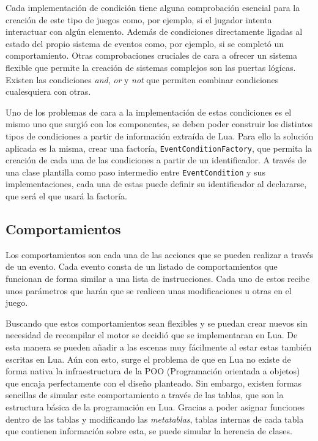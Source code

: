 \medskip

Cada implementación de condición tiene alguna comprobación esencial para la creación de este tipo de juegos como, por ejemplo, si el jugador intenta interactuar con algún elemento. Además de condiciones directamente ligadas al estado del propio sistema de eventos como, por ejemplo, si se completó un comportamiento. Otras comprobaciones cruciales de cara a ofrecer un sistema flexible que permite la creación de sistemas complejos son las puertas lógicas. Existen las condiciones \textit{and}, \textit{or} y \textit{not} que permiten combinar condiciones cualesquiera con otras. 

\medskip

Uno de los problemas de cara a la implementación de estas condiciones es el mismo uno que surgió con los componentes, se deben poder construir los distintos tipos de condiciones a partir de información extraída de Lua. Para ello la solución aplicada es la misma, crear una factoría, \texttt{EventConditionFactory}, que permita la creación de cada una de las condiciones a partir de un identificador. A través de una clase plantilla como paso intermedio entre \texttt{EventCondition} y sus implementaciones, cada una de estas puede definir su identificador al declararse, que será el que usará la factoría. 

\subsection{Comportamientos}
Los comportamientos son cada una de las acciones que se pueden realizar a través de un evento. Cada evento consta de un listado de comportamientos que funcionan de forma similar a una lista de instrucciones. Cada uno de estos recibe unos parámetros que harán que se realicen unas modificaciones u otras en el juego.

\medskip

Buscando que estos comportamientos sean flexibles y se puedan crear nuevos sin necesidad de recompilar el motor se decidió que se implementaran en Lua. De esta manera se pueden añadir a las escenas muy fácilmente al estar estas también escritas en Lua. Aún con esto, surge el problema de que en Lua no existe de forma nativa la infraestructura de la POO (Programación orientada a objetos) que encaja perfectamente con el diseño planteado. Sin embargo, existen formas sencillas de simular este comportamiento a través de las tablas, que son la estructura básica de la programación en Lua. Gracias a poder asignar funciones dentro de las tablas y modificando las \textit{metatablas}, tablas internas de cada tabla que contienen información sobre esta, se puede simular la herencia de clases.

